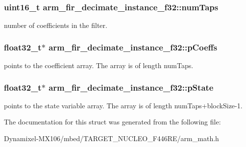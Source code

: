 \subsubsection[{\texorpdfstring{num\+Taps}{numTaps}}]{\setlength{\rightskip}{0pt plus 5cm}uint16\+\_\+t arm\+\_\+fir\+\_\+decimate\+\_\+instance\+\_\+f32\+::num\+Taps}\hypertarget{structarm__fir__decimate__instance__f32_a2aa2986129db8affef03ede88dd45a03}{}\label{structarm__fir__decimate__instance__f32_a2aa2986129db8affef03ede88dd45a03}
number of coefficients in the filter. 
\subsubsection[{\texorpdfstring{p\+Coeffs}{pCoeffs}}]{\setlength{\rightskip}{0pt plus 5cm}float32\+\_\+t$\ast$ arm\+\_\+fir\+\_\+decimate\+\_\+instance\+\_\+f32\+::p\+Coeffs}\hypertarget{structarm__fir__decimate__instance__f32_a268a8b0e80a3d9764baf33e4bc10dde2}{}\label{structarm__fir__decimate__instance__f32_a268a8b0e80a3d9764baf33e4bc10dde2}
points to the coefficient array. The array is of length num\+Taps. 
\subsubsection[{\texorpdfstring{p\+State}{pState}}]{\setlength{\rightskip}{0pt plus 5cm}float32\+\_\+t$\ast$ arm\+\_\+fir\+\_\+decimate\+\_\+instance\+\_\+f32\+::p\+State}\hypertarget{structarm__fir__decimate__instance__f32_a5bddf29aaaf2011d2e3bcec59a83f633}{}\label{structarm__fir__decimate__instance__f32_a5bddf29aaaf2011d2e3bcec59a83f633}
points to the state variable array. The array is of length num\+Taps+block\+Size-\/1. 

The documentation for this struct was generated from the following file\+:\begin{DoxyCompactItemize}
\item 
Dynamixel-\/\+M\+X106/mbed/\+T\+A\+R\+G\+E\+T\+\_\+\+N\+U\+C\+L\+E\+O\+\_\+\+F446\+R\+E/arm\+\_\+math.\+h\end{DoxyCompactItemize}
